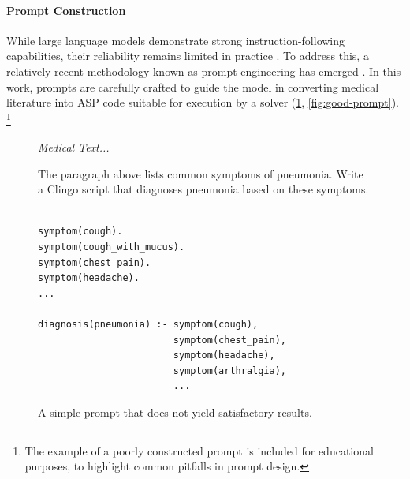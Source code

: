 \documentclass[10pt,leqno]{amsart}
\newenvironment{commandline}{
	\medskip
	\begin{mdframed}[style=commandline]
}{
	\end{mdframed}
	\medskip
}
\newenvironment{prompt}[1][Prompt:]{ %
	\medskip
	\begin{mdframed}[style=warning]
		\noindent{\textbf{#1}}
}{
	\end{mdframed}
}
\begin{document}
\paragraph{\textbf{Prompt Construction}}

While large language models demonstrate strong instruction-following capabilities, 
their reliability remains limited in practice \cite{bowman2023things}. 
To address this, a relatively recent methodology known as prompt engineering 
has emerged \cite{liu2021pretrain, promptingguidePromptEngineering}. 
In this work, prompts are carefully crafted to guide the model in 
converting medical literature into ASP code suitable for execution 
by a solver (\cref{fig:bad-prompt}, \cref{fig:good-prompt}).
\footnote{The example of a poorly constructed prompt is included for educational purposes, to highlight common pitfalls in prompt design.}

\begin{figure}[!h]
\centering
\begin{prompt}
\textit{Medical Text...}

The paragraph above lists common symptoms of pneumonia.
Write a Clingo script that diagnoses pneumonia based on these symptoms.
\end{prompt}

\begin{commandline}
\begin{verbatim}

symptom(cough).
symptom(cough_with_mucus).
symptom(chest_pain).
symptom(headache).
...

diagnosis(pneumonia) :- symptom(cough), 
                        symptom(chest_pain), 
                        symptom(headache), 
                        symptom(arthralgia),
                        ...
\end{verbatim}
\end{commandline}

\caption{A simple prompt that does not yield satisfactory results.}
\label{fig:bad-prompt}
\end{figure}
\end{document}
